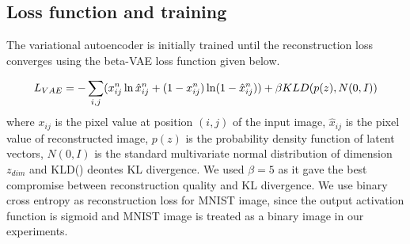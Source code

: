 \documentclass[runningheads]{llncs}
\begin{document}
\subsection{Loss function and training}
The variational autoencoder is initially trained until the reconstruction loss converges using the beta-VAE loss function\cite{beta_vae} given below.

\begin{equation} \label{vae_loss_eqn}
L_{VAE} = -\sum_{i, j}(x_{ij}^n \ln \hat{x}_{ij}^n
+ (1 - x_{ij}^n) \ln(1 -  \hat{x}_{ij}^n ) )\\
    +\beta KLD(p(z), N(0,I))
\end{equation}
where   $x_{ij}$ is the pixel value at position $(i, j)$ of the input image, $\hat{x}_{ij}$ is the pixel value of reconstructed image, $p(z)$ is the probability density function of latent vectors, $N(0,I)$ is the standard multivariate normal distribution of dimension $z_{dim}$ and KLD() deontes KL divergence.
We used $\beta = 5$ as it gave the best compromise between reconstruction quality and KL divergence.
We use binary cross entropy as reconstruction loss for MNIST image, since the output activation function is sigmoid and MNIST image is treated as a binary image in our experiments.
\end{document}

